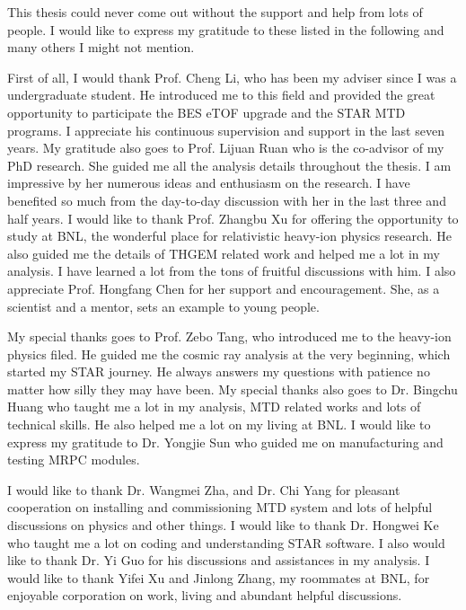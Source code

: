 ﻿\begin{thanks}

This thesis could never come out without the support and help from lots of people. I would like to express my gratitude to these listed in the following and many others I might not mention.

First of all, I would thank Prof. Cheng Li, who has been my adviser since I was a undergraduate student. He introduced me to this field and provided the great opportunity to participate the BES\uppercase\expandafter{} eTOF upgrade and the STAR MTD programs. I appreciate his continuous supervision and support in the last seven years. My gratitude also goes to Prof. Lijuan Ruan who is the co-advisor of my PhD research. She guided me all the analysis details throughout the thesis. I am impressive by her numerous ideas and enthusiasm on the research. I have benefited so much from the day-to-day discussion with her in the last three and half years. I would like to thank Prof. Zhangbu Xu for offering the opportunity to study at BNL, the wonderful place for relativistic heavy-ion physics research. He also guided me the details of THGEM related work and helped me a lot in my analysis. I have learned a lot from the tons of fruitful discussions with him. I also appreciate Prof. Hongfang Chen for her support and encouragement. She, as a scientist and a mentor, sets an example to young people.

My special thanks goes to Prof. Zebo Tang, who introduced me to the heavy-ion physics filed. He guided me the cosmic ray analysis at the very beginning, which started my STAR journey. He always answers my questions with patience no matter how silly they may have been. My special thanks also goes to Dr. Bingchu Huang who taught me a lot in my analysis, MTD related works and lots of technical skills. He also helped me a lot on my living at BNL. I would like to express my gratitude to Dr. Yongjie Sun who guided me on manufacturing and testing MRPC modules.

I would like to thank Dr. Wangmei Zha, and Dr. Chi Yang for pleasant cooperation on installing and commissioning MTD system and lots of helpful discussions on physics and other things. I would like to thank Dr. Hongwei Ke who taught me a lot on coding and understanding STAR software. I also would like to thank Dr. Yi Guo for his discussions and assistances in my analysis. I would like to thank Yifei Xu and Jinlong Zhang, my roommates at BNL, for enjoyable corporation on work, living and abundant helpful discussions. 


\end{thanks}
